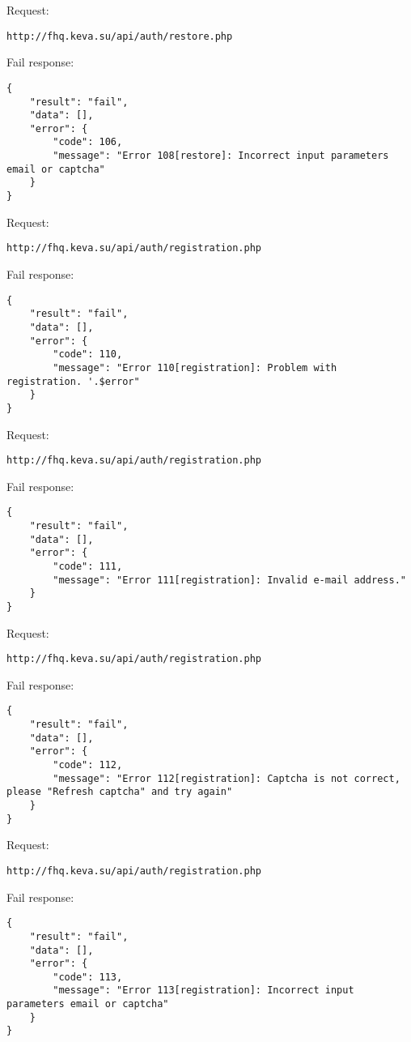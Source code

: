 Request:
\begin{Verbatim}[frame=single]
http://fhq.keva.su/api/auth/restore.php
\end{Verbatim}

Fail response:
\begin{Verbatim}[frame=single]
{
    "result": "fail",
    "data": [],
    "error": {
        "code": 106,
        "message": "Error 108[restore]: Incorrect input parameters email or captcha"
    }
}
\end{Verbatim}

Request:
\begin{Verbatim}[frame=single]
http://fhq.keva.su/api/auth/registration.php
\end{Verbatim}

Fail response:
\begin{Verbatim}[frame=single]
{
    "result": "fail",
    "data": [],
    "error": {
        "code": 110,
        "message": "Error 110[registration]: Problem with registration. '.$error"
    }
}
\end{Verbatim}

Request:
\begin{Verbatim}[frame=single]
http://fhq.keva.su/api/auth/registration.php
\end{Verbatim}

Fail response:
\begin{Verbatim}[frame=single]
{
    "result": "fail",
    "data": [],
    "error": {
        "code": 111,
        "message": "Error 111[registration]: Invalid e-mail address."
    }
}
\end{Verbatim}

Request:
\begin{Verbatim}[frame=single]
http://fhq.keva.su/api/auth/registration.php
\end{Verbatim}

Fail response:
\begin{Verbatim}[frame=single]
{
    "result": "fail",
    "data": [],
    "error": {
        "code": 112,
        "message": "Error 112[registration]: Captcha is not correct, please "Refresh captcha" and try again"
    }
}
\end{Verbatim}

Request:
\begin{Verbatim}[frame=single]
http://fhq.keva.su/api/auth/registration.php
\end{Verbatim}

Fail response:
\begin{Verbatim}[frame=single]
{
    "result": "fail",
    "data": [],
    "error": {
        "code": 113,
        "message": "Error 113[registration]: Incorrect input parameters email or captcha"
    }
}
\end{Verbatim}

